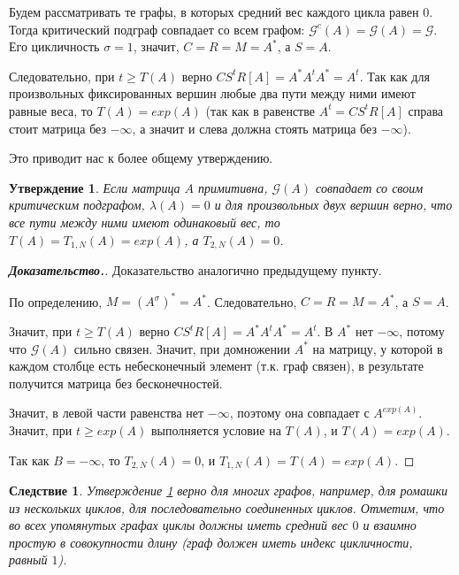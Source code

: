 \documentclass[12pt]{article}
\newtheorem{proposition}[theorem]{Утверждение}
\newtheorem{corollary}[theorem]{Следствие}
\begin{document}
Будем рассматривать те графы, в которых средний вес каждого цикла равен $0$. Тогда критический подграф совпадает со всем графом: $\mathcal{G}^c(A) = \mathcal{G}(A) = \mathcal{G}$. Его цикличность $\sigma = 1$, значит, $C = R = M = A^*$, а $S = A$.

Следовательно, при $t \ge T(A)$ верно $CS^tR[A] = A^*A^tA^* = A^t$. Так как для произвольных фиксированных вершин любые два пути между ними имеют равные веса, то $T(A) = exp(A)$ (так как в равенстве $A^t = CS^tR[A]$ справа стоит матрица без $-\infty$, а значит и слева должна стоять матрица без $-\infty$).

Это приводит нас к более общему утверждению.

\begin{proposition} \label{onePathProposition}
Если матрица $A$ примитивна, $\mathcal{G}(A)$ совпадает со своим критическим подграфом, $\lambda(A) = 0$ и для произвольных двух вершин верно, что все пути между ними имеют одинаковый вес, то $T(A) = T_{1, N}(A) = exp(A)$, а $T_{2,N}(A) = 0$.
\end{proposition}
\begin{proof}[\textbf{Доказательство.}]
Доказательство аналогично предыдущему пункту.

По определению, $M = (A^\sigma)^* = A^*$. Следовательно, $C = R = M = A^*$, а $S = A$.

Значит, при $t \ge T(A)$ верно $CS^tR[A] = A^*A^tA^* = A^t$. В $A^*$ нет $-\infty$, потому что $\mathcal{G}(A)$ сильно связен. Значит, при домножении $A^*$ на матрицу, у которой в каждом столбце есть небесконечный элемент (т.к. граф связен), в результате получится матрица без бесконечностей.

Значит, в левой части равенства нет $-\infty$, поэтому она совпадает с $A^{exp(A)}$. Значит, при $t \ge exp(A)$ выполняется условие на $T(A)$, и $T(A) = exp(A)$.

Так как $B = -\infty$, то $T_{2, N}(A) = 0$, и $T_{1,N}(A) = T(A) = exp(A)$.
\end{proof}
\begin{corollary}
\label{corollaryTandExp}
Утверждение \ref{onePathProposition} верно для многих графов, например, для ромашки из нескольких циклов, для последовательно соединенных циклов. Отметим, что во всех упомянутых графах циклы должны иметь средний вес $0$ и взаимно простую в совокупности длину (граф должен иметь индекс цикличности, равный $1$).
\end{corollary}
\end{document}
